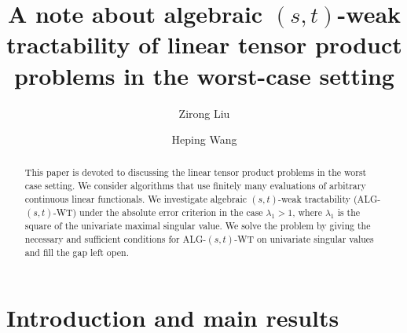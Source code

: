 \documentclass{amsart}
\numberwithin{equation}{section}
\newcommand{\al}{\alpha}
\def\RR{{\mathbb R}}
\begin{document}
\def\RR{\mathbb{R}}
\def\Exp{\text{Exp}}
\def\FF{\mathcal{F}_\al}

\title[] {A note about algebraic $(s,t)$-weak tractability of linear
tensor product problems in the worst-case setting}

\author{Zirong Liu} \address{ School of Mathematical Sciences, Capital Normal
University, Beijing 100048, China.} 

\author{Heping Wang} \address{ School of Mathematical Sciences, Capital Normal
University, Beijing 100048, China.}









\begin{abstract}

This paper is devoted to discussing  the  linear tensor product
problems in the worst  case setting. We consider algorithms that
use finitely many evaluations of arbitrary continuous linear
functionals. We investigate  algebraic $(s,t)$-weak tractability
(ALG-$(s,t)$-WT) under the absolute error criterion  in the case
$\lambda_1>1$, where $\lambda_1$ is the square of the univariate
maximal singular value. We solve the problem by
 giving the necessary and sufficient conditions
for ALG-$(s,t)$-WT on univariate  singular values   and fill the
gap left open.
\end{abstract}


\maketitle


\section{Introduction and main results}
\end{document}

